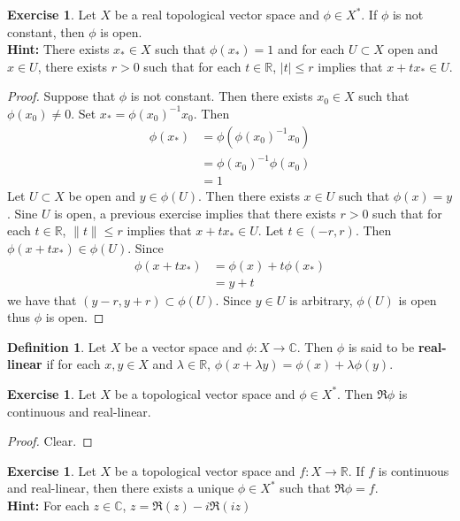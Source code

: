 \documentclass[12pt]{amsart}
\theoremstyle{definition}
\newtheorem{defn}[definition]{Definition}
\newtheorem{ex}[definition]{Exercise}
\newcommand{\lam}{\lambda}
\newcommand{\C}{\mathbb{C}}
\newcommand{\R}{\mathbb{R}}
\newcommand{\tbf}[1]{\textbf{#1}}
\DeclareMathOperator*{\0}{\mbf{0}}
\DeclareMathOperator*{\1}{\mbf{1}}
\begin{document}
	\begin{ex}
		Let $X$ be a real topological vector space and $\phi \in X^*$. If $\phi$ is not constant, then $\phi$ is open. \\
		\tbf{Hint:} There exists $x_* \in X$  such that $\phi(x_*) = 1$ and for each $U \subset X$ open and $x \in U$, there exists $r >0$ such that for each $t \in \R$, $|t| \leq r$ implies that $x + tx_* \in U$. 
	\end{ex}
	
	\begin{proof}
		Suppose that $\phi$ is not constant. Then there exists $x_0 \in X$ such that $\phi(x_0) \neq 0$. Set $x_* = \phi(x_0)^{-1} x_0$. Then
		\begin{align*}
			\phi(x_*)
			&= \phi(\phi(x_0)^{-1}x_0) \\
			&= \phi(x_0)^{-1}\phi(x_0) \\
			&= 1
		\end{align*}
		Let $U \subset X$ be open and $y \in \phi(U)$. Then there exists $x \in U$ such that $\phi(x) = y$. Sine $U$ is open, a previous exercise implies that there exists $r > 0$ such that for each $t \in \R$, $\|t\| \leq r$ implies that $x + tx_* \in U$. Let $t \in (-r, r)$. Then $\phi(x+ tx_*) \in \phi(U)$. Since 
		\begin{align*}
			\phi(x+ tx_*) 
			&= \phi(x) + t\phi(x_*) \\
			&= y + t
		\end{align*}
	we have that $(y-r, y+r) \subset \phi(U)$. Since $y \in U$ is arbitrary, $\phi(U)$ is open thus $\phi$ is open. 
	\end{proof}

	\begin{defn}
		Let $X$ be a vector space and $\phi: X \rightarrow \C$. Then $\phi$ is said to be \tbf{real-linear} if for each $x,y \in X$ and $\lam \in \R$, $\phi(x+ \lam y) = \phi(x) + \lam \phi(y)$.
	\end{defn}

	\begin{ex}
		Let $X$ be a topological vector space and $\phi \in X^*$. Then $\Re \phi$ is continuous and real-linear. 
	\end{ex}

	\begin{proof}
		Clear.
	\end{proof}

	\begin{ex}
		Let $X$ be a topological vector space and $f:X \rightarrow \R$. If $f$ is continuous and real-linear, then there exists a unique $\phi \in X^*$ such that $\Re \phi = f$. \\
		\tbf{Hint:} For each $z \in \C$, $z = \Re(z) - i \Re(iz)$
	\end{ex}
	
\end{document}

